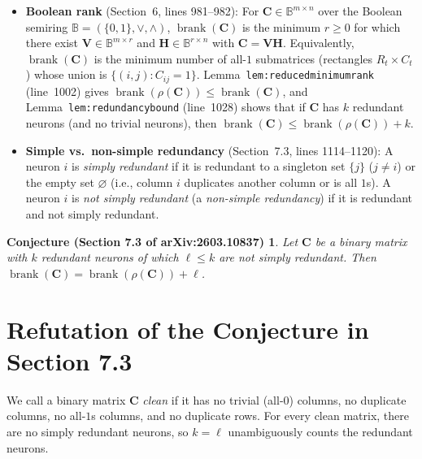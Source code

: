 \documentclass[11pt]{article}
\theoremstyle{plain}
\newtheorem*{conjecture*}{Conjecture (Section 7.3 of arXiv:2603.10837)}
\theoremstyle{definition}
\theoremstyle{remark}
\DeclareMathOperator{\brank}{brank}
\begin{document}
\begin{itemize}[leftmargin=2em]
\begin{itemize}[leftmargin=1.5em]
  \item The \emph{minimum neuron number} $\lambda(\mathcal{C})$ (Section~7.2, line~1102) is the smallest $n$ such that $\mathcal{C}$ is isomorphic to a code in $2^{[n]}$; by Remark~\texttt{rmk:reductionmorphism}, $\lambda(\mathcal{C})$ equals the number of columns of $\rho(\mathbf{C})$.
  \end{itemize}
\item \textbf{Boolean rank} (Section~6, lines 981--982): For $\mathbf{C} \in \mathbb{B}^{m \times n}$ over the Boolean semiring $\mathbb{B} = (\{0,1\}, \vee, \wedge)$, $\brank(\mathbf{C})$ is the minimum $r \ge 0$ for which there exist $\mathbf{V} \in \mathbb{B}^{m \times r}$ and $\mathbf{H} \in \mathbb{B}^{r \times n}$ with $\mathbf{C} = \mathbf{V}\mathbf{H}$. Equivalently, $\brank(\mathbf{C})$ is the minimum number of all-$1$ submatrices (rectangles $R_t \times C_t$) whose union is $\{(i,j) : C_{ij} = 1\}$. Lemma~\texttt{lem:reducedminimumrank} (line~1002) gives $\brank(\rho(\mathbf{C})) \le \brank(\mathbf{C})$, and Lemma~\texttt{lem:redundancybound} (line~1028) shows that if $\mathbf{C}$ has $k$ redundant neurons (and no trivial neurons), then $\brank(\mathbf{C}) \le \brank(\rho(\mathbf{C})) + k$.
\item \textbf{Simple vs.\ non-simple redundancy} (Section~7.3, lines 1114--1120): A neuron $i$ is \emph{simply redundant} if it is redundant to a singleton set $\{j\}$ ($j \neq i$) or the empty set $\varnothing$ (i.e., column $i$ duplicates another column or is all $1$s). A neuron $i$ is \emph{not simply redundant} (a \emph{non-simple redundancy}) if it is redundant and not simply redundant.
\end{itemize}

\begin{conjecture*}
Let $\mathbf{C}$ be a binary matrix with $k$ redundant neurons of which $\ell \le k$ are not simply redundant. Then $\brank(\mathbf{C}) = \brank(\rho(\mathbf{C})) + \ell$.
\end{conjecture*}

\section{Refutation of the Conjecture in Section 7.3}

We call a binary matrix $\mathbf{C}$ \emph{clean} if it has no trivial (all-$0$) columns, no duplicate columns, no all-$1$s columns, and no duplicate rows. For every clean matrix, there are no simply redundant neurons, so $k = \ell$ unambiguously counts the redundant neurons.
\end{document}
